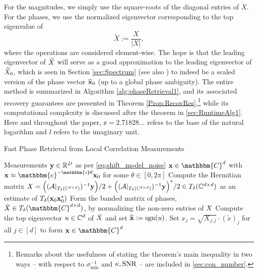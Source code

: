   For the magnitudes, we simply use the square-roots of the diagonal entries of $X$. For the phases, we use the normalized eigenvector corresponding to the top eigenvalue of \begin{equation}\widetilde{X}:=\frac{X}{|X|},\label{eq:Xtilde}\end{equation} where the operations are considered element-wise.  The hope is that the leading eigenvector of $\widetilde{X}$ will serve as a good approximation to the leading eigenvector of $\widetilde{X}_0$, which is seen in Section \ref{sec:Spectrum} (see also \cite{IV_SPIE}) to indeed be a scaled version of the phase vector $\widetilde{\mathbf x}_0$ (up to a global phase ambiguity).  The entire method is summarized in Algorithm \ref{alg:phaseRetrieval1}, and its associated recovery guarantees are presented in Theorem \ref{Prop:RecovRes},\footnote{Remarks about the usefulness of stating the theorem's main inequality in two ways -- with respect to $\sigma_{\min}^{-1}$ and $\kappa, \operatorname{SNR}$ -- are included in \cref{sec:con_number}.} while its computational complexity is discussed after the theorem in \cref{sec:RuntimeAlg1}.  Here and throughout the paper, $\ee = 2.71828\ldots$ refers to the base of the natural logarithm and $\ii$ refers to the imaginary unit.
\begin{algorithm}
\renewcommand{\algorithmicrequire}{\textbf{Input:}}
\renewcommand{\algorithmicensure}{\textbf{Output:}}
\caption{Fast Phase Retrieval from Local Correlation Measurements}
\label{alg:phaseRetrieval1}
\begin{algorithmic}[1]
    \REQUIRE Measurements $\mathbf y\in \mathbb{R}^D$ as per \eqref{eq:shift_model_noise}
    \ENSURE ${\bf x} \in \mathbbm{C}^d$ with ${\bf x} \approx \mathbbm{e}^{-\mathbbm{i} \theta} {\bf x}_0$ for some $\theta \in [0, 2 \pi]$
    \STATE Compute the Hermitian matrix $X = \Big( (\mathcal{A}|_{T_\delta(\mathbb{C}^{d\times d})})^{-1} {\bf y}\Big)/2 + \Big( (\mathcal{A}|_{T_\delta(\mathbb{C}^{d\times d})})^{-1} {\bf y}\Big)^*/2  \in T_\delta(\mathbb{C}^{d\times d})$ as an estimate of $T_\delta(\mathbf x_0\mathbf x_0^*)$%
    \STATE Form the banded matrix of phases, $\tilde{\X} \in T_\delta(\mathbbm{C}^{d \times d})$, by normalizing the non-zero entries of $X$ %
    \STATE Compute the top eigenvector $u \in \mathbb{C}^d$ of $\tilde{X}$ and set $\widetilde{\mathbf x} := \mathrm{sgn}(u)$.
    \STATE Set $x_j = \sqrt{X_{j,j}} \cdot (\tilde{x})_j$ for all $j \in [d]$ to form $\x \in \mathbbm{C}^d$
    \end{algorithmic}
\end{algorithm}

